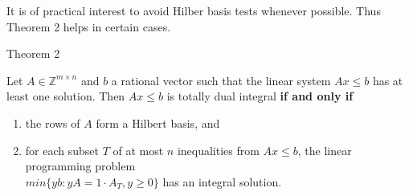 \documentclass{beamer}
\begin{document}
	





\begin{frame}

	\begin{block}

		It is of practical interest to avoid Hilber basis tests whenever possible. Thus Theorem 2 helps in certain cases.

	\end{block}

	\pause

	\begin{block}{Theorem 2}

		Let $A\in \mathbb{Z}^{m \times n}$ and $b$ a rational vector such that the linear system $Ax \leq b$ has at least one solution. Then $Ax \leq b$ is totally dual integral \textbf{if and only if}\\

		\begin{enumerate}[i]

			\item the rows of $A$ form a Hilbert basis, and

			\item for each subset $T$ of at most $n$ inequalities from $Ax\leq b$, the linear programming problem \\
			$min\{yb: yA=1\cdot A_T, y\geq 0 \}$ has an integral solution.

		\end{enumerate}

	\end{block}

\end{frame}
\end{document}
